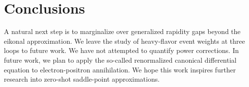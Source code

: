 \section{Conclusions}\label{sec:conclusions}

A natural next step is to marginalize over generalized rapidity gaps
beyond the eikonal approximation. We leave the study of heavy-flavor
event weights at three loops to future work. We have not attempted to
quantify power corrections. In future work, we plan to apply the
so-called renormalized canonical differential equation to
electron-positron annihilation. We hope this work inspires further
research into zero-shot saddle-point approximations.

